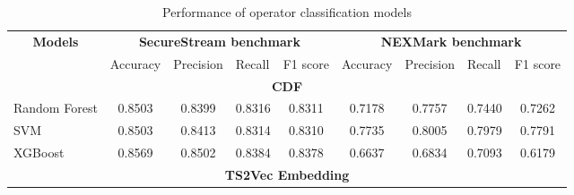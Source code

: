 \begin{table}
\centering
\caption{Performance of operator classification models}
\label{tab:performances_single_benchmark}
\begin{tabular}{lcccccccc}
\hline
\multicolumn{1}{c}{\multirow{2}{*}{\textbf{Models}}} & \multicolumn{4}{c}{\textbf{SecureStream benchmark}}                                                                      & \multicolumn{4}{c}{\textbf{NEXMark benchmark}}                                                                           \\ \cline{2-9} 
\multicolumn{1}{c}{}                                 & \multicolumn{1}{l}{Accuracy} & \multicolumn{1}{l}{Precision} & \multicolumn{1}{l}{Recall} & \multicolumn{1}{l}{F1 score} & \multicolumn{1}{l}{Accuracy} & \multicolumn{1}{l}{Precision} & \multicolumn{1}{l}{Recall} & \multicolumn{1}{l}{F1 score} \\ \hline
\multicolumn{9}{c}{\textbf{CDF}}                                                                                                                                                                                                                                                                           \\ \hline
Random Forest                                        & 0.8503                       & 0.8399                        & 0.8316                     & 0.8311                       & 0.7178                       & 0.7757                        & 0.7440                     & 0.7262                       \\
SVM                                                  & 0.8503                       & 0.8413                        & 0.8314                     & 0.8310                       & 0.7735                       & 0.8005                        & 0.7979                     & 0.7791                       \\
XGBoost                                              & 0.8569                       & 0.8502                        & 0.8384                     & 0.8378                       & 0.6637                       & 0.6834                        & 0.7093                     & 0.6179                       \\ \hline
\multicolumn{9}{c}{\textbf{TS2Vec Embedding}}                                                                                                                                                                                                                                                              \\ \hline

\end{tabular}
\end{table}
